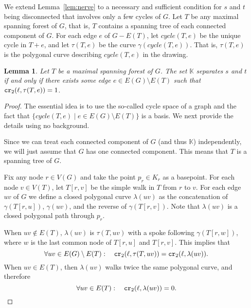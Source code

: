 \documentclass[a4paper,11pt]{article}
\newcommand{\KK}{\mathbb{K}}
\newcommand{\cycle}{\mathit{cycle}}
\newcommand\CR{\mbox{\tt cr}_2}
\newtheorem{lemma}[theorem]{Lemma}
\begin{document}
We extend Lemma~\ref{lem:nerve} 
to a necessary and sufficient condition for $s$ and $t$ being disconnected
that involves only a few cycles of $G$. 
Let $T$ be any maximal spanning forest of $G$, that is, $T$ contains a spanning
tree of each connected component of $G$. 
For each edge $e$ of $G-E(T)$, let $\cycle(T,e)$ be the unique cycle
in $T+e$, and let $\tau(T,e)$ be the curve $\gamma(\cycle(T,e))$.
That is, $\tau(T,e)$ is the polygonal curve describing $\cycle(T,e)$ in the drawing.

\begin{lemma}
\label{lem:homology_condition}
	Let $T$ be a maximal spanning forest of $G$.
	The set $\KK$ separates $s$ and $t$ if and only if
	there exists some edge $e\in E(G)\setminus E(T)$ such that $\CR(\ell,\tau(T,e))=1$.
\end{lemma}
\begin{proof}
	The essential idea is to use the so-called cycle space of a graph and the fact that
	$\{ \cycle(T,e) \mid e\in E(G)\setminus E(T)\}$ is a basis. We next provide the details
	using no background.
	
	Since we can treat each connected component of $G$ (and thus $\KK$) independently,
	we will just assume that $G$ has one connected component. This means that $T$ is a spanning
	tree of $G$.
	
	Fix any node $r\in V(G)$ and take the point $p_r\in K_r$ as a basepoint. 
	For each node $v\in V(T)$, let $T[r,v]$ be the simple walk in $T$ from $r$ to $v$.
	For each edge $uv$ of $G$ we define a closed polygonal curve $\lambda(uv)$ 
	as the concatenation of $\gamma(T[r,u])$, $\gamma(uv)$, and the reverse of $\gamma(T[r,v])$.
	Note that $\lambda(uv)$ is a closed polygonal path through $p_r$.
	
	When $uv\notin E(T)$, $\lambda(uv)$ is $\tau(T,uv)$ with a spoke following $\gamma(T[r,w])$,
	where $w$ is the last common node of $T[r,u]$ and $T[r,v]$.
	This implies that 
	\begin{equation}
		\forall uv \in E(G)\setminus E(T): ~~~
			\CR(\ell,\tau(T,uv)) = \CR(\ell,\lambda(uv)).
		\label{eq:noT}
	\end{equation}
	When $uv\in E(T)$, then $\lambda(uv)$ walks twice the same polygonal curve,
	and therefore 
	\begin{equation}
		\forall uv \in E(T): ~~~
			\CR(\ell,\lambda(uv))=0.
		\label{eq:T}
	\end{equation}
	

\end{proof}
\end{document}
